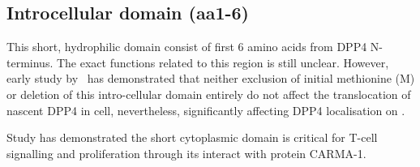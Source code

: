 \subsection{Introcellular domain (aa1-6)}

This short, hydrophilic domain consist of first 6 amino acids from DPP4 N-terminus. The exact functions related to this region is still unclear. However, early study by~\citet{Hong1990} has demonstrated that neither exclusion of initial methionine (M) or deletion of this intro-cellular domain entirely do not affect the translocation of nascent DPP4 in cell, nevertheless, significantly affecting DPP4 localisation on . 

Study has demonstrated the short cytoplasmic domain is critical for T-cell signalling and proliferation through its interact with protein CARMA-1. \cite{Ohnuma_2007}